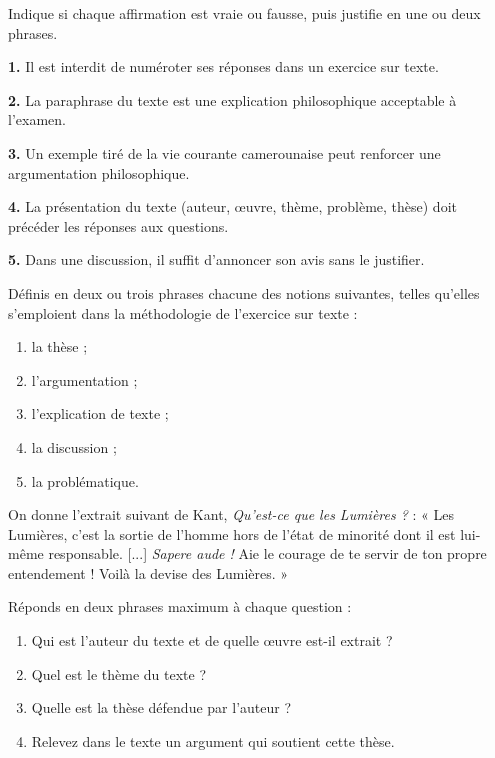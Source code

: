 \documentclass[11pt]{article}
\newcommand{\cle}[1]{{\popxbold\color{popdark}#1}}
\begin{document}
\begin{exercice}
Indique si chaque affirmation est vraie ou fausse, puis justifie en une ou deux phrases.

\textbf{1.} Il est interdit de numéroter ses réponses dans un exercice sur texte.

\textbf{2.} La paraphrase du texte est une explication philosophique acceptable à l'examen.

\textbf{3.} Un exemple tiré de la vie courante camerounaise peut renforcer une argumentation philosophique.

\textbf{4.} La présentation du texte (auteur, œuvre, thème, problème, thèse) doit précéder les réponses aux questions.

\textbf{5.} Dans une discussion, il suffit d'annoncer son avis sans le justifier.
\end{exercice}

\begin{exercice}
Définis en deux ou trois phrases chacune des notions suivantes, telles qu'elles s'emploient dans la méthodologie de l'exercice sur texte :
\begin{enumerate}
\item la \cle{thèse} ;
\item l'\cle{argumentation} ;
\item l'\cle{explication de texte} ;
\item la \cle{discussion} ;
\item la \cle{problématique}.
\end{enumerate}
\end{exercice}

\begin{exercice}
On donne l'extrait suivant de Kant, \emph{Qu'est-ce que les Lumières ?} : « Les Lumières, c'est la sortie de l'homme hors de l'état de minorité dont il est lui-même responsable. [...] \emph{Sapere aude !} Aie le courage de te servir de ton propre entendement ! Voilà la devise des Lumières. »

Réponds en deux phrases maximum à chaque question :
\begin{enumerate}
\item Qui est l'auteur du texte et de quelle œuvre est-il extrait ?
\item Quel est le thème du texte ?
\item Quelle est la thèse défendue par l'auteur ?
\item Relevez dans le texte un argument qui soutient cette thèse.
\end{enumerate}
\end{exercice}
\end{document}
